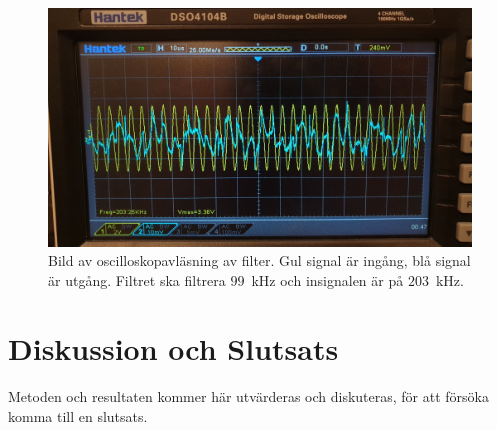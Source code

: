 \documentclass[a4paper]{article}
\begin{document}
\begin{sloppypar}
    \begin{figure}
        \centering
        \includegraphics[width=\textwidth]{Filter-200kHz.jpg}
        \caption{Bild av oscilloskopavläsning av filter. Gul signal är ingång, blå signal är utgång. Filtret ska filtrera $99$~kHz och insignalen är på $203$~kHz.}
        \label{fig:signal-99kHz-Filter-200kHz}
    \end{figure}

    \newpage
    \section{Diskussion och Slutsats}
    Metoden och resultaten kommer här utvärderas och diskuteras, för att försöka komma till en slutsats.


\end{sloppypar}
\end{document}

